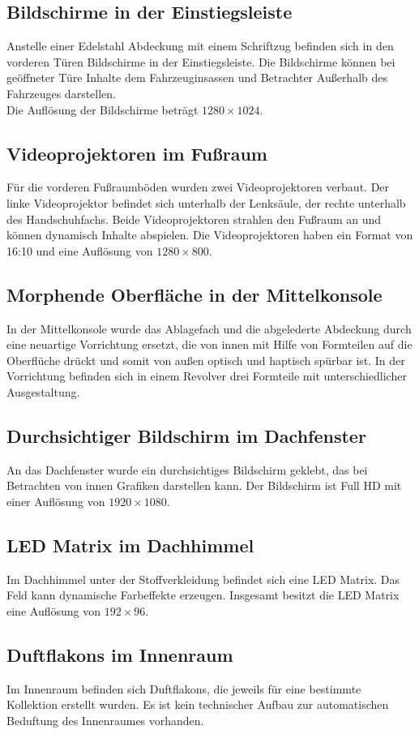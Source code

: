 \subsection{Bildschirme in der Einstiegsleiste}
Anstelle einer Edelstahl Abdeckung mit einem Schriftzug befinden sich in den vorderen Türen Bildschirme in der Einstiegsleiste. Die Bildschirme können bei geöffneter Türe Inhalte dem Fahrzeuginsassen und Betrachter Außerhalb des Fahrzeuges darstellen.\\
Die Auflösung der Bildschirme beträgt $ 1280\times1024 $.
\subsection{Videoprojektoren im Fußraum}
Für die vorderen Fußraumböden wurden zwei Videoprojektoren verbaut. Der linke Videoprojektor befindet sich unterhalb der Lenksäule, der rechte unterhalb des Handschuhfachs. Beide Videoprojektoren strahlen den Fußraum an und können dynamisch Inhalte abspielen.
Die Videoprojektoren haben ein Format von 16:10 und eine Auflösung von $ 1280\times800 $.
\subsection{Morphende Oberfläche in der Mittelkonsole}
In der Mittelkonsole wurde das Ablagefach und die abgelederte Abdeckung durch eine neuartige Vorrichtung ersetzt, die von innen mit Hilfe von Formteilen auf die Oberflüche drückt und somit von außen optisch und haptisch spürbar ist. In der Vorrichtung befinden sich in einem Revolver drei Formteile mit unterschiedlicher Ausgestaltung.
\subsection{Durchsichtiger Bildschirm im Dachfenster}
An das Dachfenster wurde ein durchsichtiges Bildschirm geklebt, das bei Betrachten von innen Grafiken darstellen kann.
Der Bildschirm ist Full HD mit einer Auflösung von $ 1920\times1080 $.
\subsection{LED Matrix im Dachhimmel}
Im Dachhimmel unter der Stoffverkleidung befindet sich eine LED Matrix. Das Feld kann dynamische Farbeffekte erzeugen.
Insgesamt besitzt die LED Matrix eine Auflösung von $ 192\times96 $.
\subsection{Duftflakons im Innenraum}
Im Innenraum befinden sich Duftflakons, die jeweils für eine bestimmte Kollektion erstellt wurden. Es ist kein technischer Aufbau zur automatischen Beduftung des Innenraumes vorhanden.
